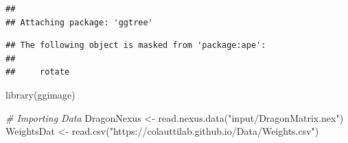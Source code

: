 \documentclass[
]{article}
\newenvironment{Shaded}{\begin{snugshade}}{\end{snugshade}}
\newcommand{\CommentTok}[1]{\textcolor[rgb]{0.56,0.35,0.01}{\textit{#1}}}
\newcommand{\FunctionTok}[1]{\textcolor[rgb]{0.00,0.00,0.00}{#1}}
\newcommand{\NormalTok}[1]{#1}
\newcommand{\OtherTok}[1]{\textcolor[rgb]{0.56,0.35,0.01}{#1}}
\newcommand{\StringTok}[1]{\textcolor[rgb]{0.31,0.60,0.02}{#1}}
\begin{document}
\begin{verbatim}
## 
## Attaching package: 'ggtree'
\end{verbatim}

\begin{verbatim}
## The following object is masked from 'package:ape':
## 
##     rotate
\end{verbatim}

\begin{Shaded}
\begin{Highlighting}[]
\FunctionTok{library}\NormalTok{(ggimage)}
\end{Highlighting}
\end{Shaded}

\begin{Shaded}
\begin{Highlighting}[]
\CommentTok{\# Importing Data}
\NormalTok{DragonNexus }\OtherTok{\textless{}{-}} \FunctionTok{read.nexus.data}\NormalTok{(}\StringTok{"input/DragonMatrix.nex"}\NormalTok{)}
\NormalTok{WeightsDat }\OtherTok{\textless{}{-}} \FunctionTok{read.csv}\NormalTok{(}\StringTok{"https://colauttilab.github.io/Data/Weights.csv"}\NormalTok{)}
\end{Highlighting}
\end{Shaded}
\end{document}
